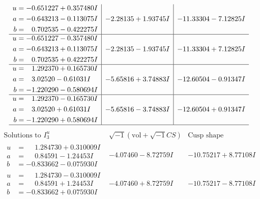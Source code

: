 \documentclass[1p]{elsarticle_modified}
\theoremstyle{definition}
\newcommand{\I}{\sqrt{-1}}
\begin{document}
$$\begin{array}{c|c|c}
\begin{aligned}
u &= -0.651227 + 0.357480 I \\
a &= -0.643213 - 0.113075 I \\
b &= \phantom{-}0.702535 - 0.422275 I\end{aligned}
 & -2.28135 + 1.93745 I & -11.33304 - 7.12825 I \\ \hline\begin{aligned}
u &= -0.651227 - 0.357480 I \\
a &= -0.643213 + 0.113075 I \\
b &= \phantom{-}0.702535 + 0.422275 I\end{aligned}
 & -2.28135 - 1.93745 I & -11.33304 + 7.12825 I \\ \hline\begin{aligned}
u &= \phantom{-}1.292370 + 0.165730 I \\
a &= \phantom{-}3.02520 - 0.61031 I \\
b &= -1.220290 - 0.580694 I\end{aligned}
 & -5.65816 + 3.74883 I & -12.60504 - 0.91347 I \\ \hline\begin{aligned}
u &= \phantom{-}1.292370 - 0.165730 I \\
a &= \phantom{-}3.02520 + 0.61031 I \\
b &= -1.220290 + 0.580694 I\end{aligned}
 & -5.65816 - 3.74883 I & -12.60504 + 0.91347 I\\
 \hline 
 \end{array}$$\newpage$$\begin{array}{c|c|c}  
\text{Solutions to }I^u_{3}& \I (\text{vol} + \sqrt{-1}CS) & \text{Cusp shape}\\
 \hline 
\begin{aligned}
u &= \phantom{-}1.284730 + 0.310009 I \\
a &= \phantom{-}0.84591 - 1.24453 I \\
b &= -0.833662 - 0.075930 I\end{aligned}
 & -4.07460 - 8.72759 I & -10.75217 + 8.77108 I \\ \hline\begin{aligned}
u &= \phantom{-}1.284730 - 0.310009 I \\
a &= \phantom{-}0.84591 + 1.24453 I \\
b &= -0.833662 + 0.075930 I\end{aligned}
 & -4.07460 + 8.72759 I & -10.75217 - 8.77108 I \\ \hline\begin{aligned}

\end{aligned}
\end{array}$$
\end{document}
